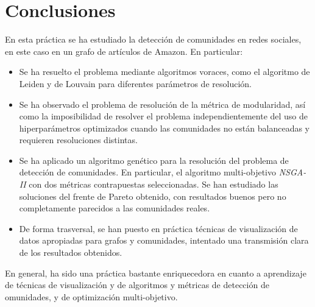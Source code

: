 \section{Conclusiones}
En esta práctica se ha estudiado la detección de comunidades en redes sociales,
en este caso en un grafo de artículos de Amazon. En particular:

\begin{itemize}
  \item Se ha resuelto el problema mediante algoritmos voraces, como el
    algoritmo de Leiden y de Louvain para diferentes parámetros de resolución.
  \item Se ha observado el problema de resolución de la métrica de modularidad,
    así como la imposibilidad de resolver el problema independientemente del
    uso de hiperparámetros optimizados cuando las comunidades no están balanceadas
    y requieren resoluciones distintas.
  \item Se ha aplicado un algoritmo genético para la resolución del problema de
    detección de comunidades. En particular, el algoritmo multi-objetivo
    \emph{NSGA-II} con dos métricas contrapuestas seleccionadas. Se han
    estudiado las soluciones del frente de Pareto obtenido, con resultados
    buenos pero no completamente parecidos a las comunidades reales.
  \item De forma trasversal, se han puesto en práctica técnicas de visualización
    de datos apropiadas para grafos y comunidades, intentado una transmisión
    clara de los resultados obtenidos.
\end{itemize}

En general, ha sido una práctica bastante enriquecedora en cuanto a aprendizaje
de técnicas de visualización y de algoritmos y métricas de detección de
omunidades, y de optimización multi-objetivo.



